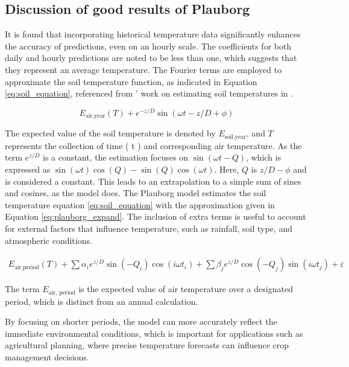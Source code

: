 \subsection{Discussion of good results of Plauborg}

It is found that incorporating historical temperature data significantly enhances the accuracy of predictions, even on an hourly scale. The coefficients for both daily and hourly predictions are noted to be less than one, which suggests that they represent an average temperature. The Fourier terms are employed to approximate the soil temperature function, as indicated in Equation \eqref{eq:soil_equation}, referenced from \citeauthor{holt_forecasting_2004}’ work \cite{holmes_estimating_2008} on estimating soil temperatures in \citeyear{holmes_estimating_2008}.

\begin{equation}
E_{\text{air,year}}(T) + e^{-z/D}\sin(\omega t - z/D + \phi)\label{eq:soil_equation}
\end{equation}

The expected value of the soil temperature is denoted by $ E_{\text{soil,year}} $, and $T$  represents the collection of time ( t ) and corresponding air temperature. As the term $ e^{z/D} $ is a constant, the estimation focuses on $ \sin(\omega t - Q) $, which is expressed as $ \sin(\omega t)\cos(Q) - \sin(Q)\cos(\omega t) $. Here, $ Q $ is $ z/D - \phi $ and is considered a constant. This leads to an extrapolation to a simple sum of sines and cosines, as the model does. The Plauborg model estimates the soil temperature equation \eqref{eq:soil_equation} with the approximation given in Equation \eqref{eq:plauborg_expand}. The inclusion of extra terms is useful to account for external factors that influence temperature, such as rainfall, soil type, and atmospheric conditions.

\begin{align}
E_{\text{air,period}}(T) + \sum \alpha_ie^{z/D}\sin(-Q_i)\cos(i\omega t_i) + \sum \beta_je^{z/D}\cos(-Q_j)\sin(i\omega t_j) + \varepsilon\label{eq:plauborg_expand}
\end{align}

The term $ E_{\text{air, period}} $ is the expected value of air temperature over a designated period, which is distinct from an annual calculation.

By focusing on shorter periods, the model can more accurately reflect the immediate environmental conditions, which is important for applications such as agricultural planning, where precise temperature forecasts can influence crop management decisions.

